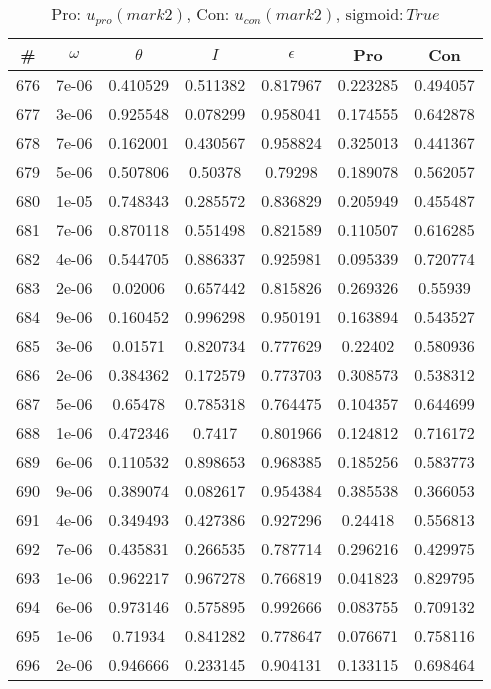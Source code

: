 \newpage
\begin{table}
\caption{Pro: $u_{pro} (mark 2)$, Con: $u_{con} (mark 2)$, $\mathrm{sigmoid}: True$}
\begin{tabular*}{\linewidth}{c|c|c|c|c|c|c}
\# & $\omega$ & $\theta$ & $I$ & $\epsilon$ & Pro & Con \\
\hline
676 & 7e-06 & 0.410529 & 0.511382 & 0.817967 & 0.223285 & 0.494057\\
677 & 3e-06 & 0.925548 & 0.078299 & 0.958041 & 0.174555 & 0.642878\\
678 & 7e-06 & 0.162001 & 0.430567 & 0.958824 & 0.325013 & 0.441367\\
679 & 5e-06 & 0.507806 & 0.50378 & 0.79298 & 0.189078 & 0.562057\\
680 & 1e-05 & 0.748343 & 0.285572 & 0.836829 & 0.205949 & 0.455487\\
681 & 7e-06 & 0.870118 & 0.551498 & 0.821589 & 0.110507 & 0.616285\\
682 & 4e-06 & 0.544705 & 0.886337 & 0.925981 & 0.095339 & 0.720774\\
683 & 2e-06 & 0.02006 & 0.657442 & 0.815826 & 0.269326 & 0.55939\\
684 & 9e-06 & 0.160452 & 0.996298 & 0.950191 & 0.163894 & 0.543527\\
685 & 3e-06 & 0.01571 & 0.820734 & 0.777629 & 0.22402 & 0.580936\\
686 & 2e-06 & 0.384362 & 0.172579 & 0.773703 & 0.308573 & 0.538312\\
687 & 5e-06 & 0.65478 & 0.785318 & 0.764475 & 0.104357 & 0.644699\\
688 & 1e-06 & 0.472346 & 0.7417 & 0.801966 & 0.124812 & 0.716172\\
689 & 6e-06 & 0.110532 & 0.898653 & 0.968385 & 0.185256 & 0.583773\\
690 & 9e-06 & 0.389074 & 0.082617 & 0.954384 & 0.385538 & 0.366053\\
691 & 4e-06 & 0.349493 & 0.427386 & 0.927296 & 0.24418 & 0.556813\\
692 & 7e-06 & 0.435831 & 0.266535 & 0.787714 & 0.296216 & 0.429975\\
693 & 1e-06 & 0.962217 & 0.967278 & 0.766819 & 0.041823 & 0.829795\\
694 & 6e-06 & 0.973146 & 0.575895 & 0.992666 & 0.083755 & 0.709132\\
695 & 1e-06 & 0.71934 & 0.841282 & 0.778647 & 0.076671 & 0.758116\\
696 & 2e-06 & 0.946666 & 0.233145 & 0.904131 & 0.133115 & 0.698464\\

\end{tabular*}
\end{table}
